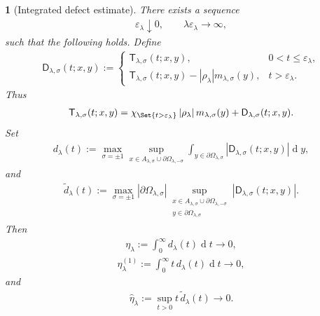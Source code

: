 \documentclass[a4paper,10pt]{article}
\numberwithin{equation}{section}
\theoremstyle{plain}
\theoremstyle{plain}
\newtheorem{lem}[thm]{\protect\lemmaname}
\theoremstyle{plain}
\theoremstyle{plain}
\theoremstyle{plain}
\theoremstyle{remark}
\theoremstyle{definition}
\providecommand{\lemmaname}{Lemma}
\newcommand{\dif}{\operatorname{d}\!} %
\newcommand{\abs}[1]{\left\lvert#1\right\rvert}
\newcommand{\eql}[1]{\begin{align}#1\end{align}}
\begin{document}
\begin{lem}[Integrated defect estimate]
\label{lem:integrated-defect-estimate}
There exists a sequence
\eql{
\varepsilon_\lambda\downarrow0,
\qquad
\lambda\varepsilon_\lambda\longrightarrow\infty,
\label{eq:choice-relaxation-time}
}
such that the following holds. Define
\eql{
\mathsf D_{\lambda,\sigma}(t;x,y)
:=
\begin{cases}
\mathsf T_{\lambda,\sigma}(t;x,y),
&0<t\leq\varepsilon_\lambda,\\[0.4em]
\mathsf T_{\lambda,\sigma}(t;x,y)-\abs{\rho_\lambda} m_{\lambda,\sigma}(y),
&t>\varepsilon_\lambda.
\end{cases}
\label{eq:defect-kernel}
}
Thus
\eql{
\mathsf T_{\lambda,\sigma}(t;x,y)
=
\chi_{\Set{t>\varepsilon_\lambda}}
\abs{\rho_\lambda} m_{\lambda,\sigma}(y)
+
\mathsf D_{\lambda,\sigma}(t;x,y).
\label{eq:good-plus-defect}
}
Set
\eql{
d_\lambda(t)
:=
\max_{\sigma=\pm1}
\sup_{x\in A_{\lambda,\sigma}\cup\partial\Omega_{\lambda,-\sigma}}
\int_{y\in\partial\Omega_{\lambda,\sigma}}
\abs{\mathsf D_{\lambda,\sigma}(t;x,y)}\dif{y},
\label{eq:def-d-lambda}
}
and
\eql{
\widetilde d_\lambda(t)
:=
\max_{\sigma=\pm1}
\abs{\partial\Omega_{\lambda,\sigma}}
\sup_{\substack{
x\in A_{\lambda,\sigma}\cup\partial\Omega_{\lambda,-\sigma}\\
y\in\partial\Omega_{\lambda,\sigma}
}}
\abs{\mathsf D_{\lambda,\sigma}(t;x,y)}.
\label{eq:def-dtilde-lambda}
}
Then
\eql{
\eta_\lambda
:=
\int_0^\infty d_\lambda(t)\dif{t}
\longrightarrow0,
\label{eq:q-lambda}
}
\eql{
\eta_\lambda^{(1)}
:=
\int_0^\infty t\,d_\lambda(t)\dif{t}
\longrightarrow0,
\label{eq:q1-lambda}
}
and
\eql{
\widehat\eta_\lambda
:=
\sup_{t>0}t\,\widetilde d_\lambda(t)
\longrightarrow0.
\label{eq:qhat-lambda}
}
\end{lem}
\end{document}
